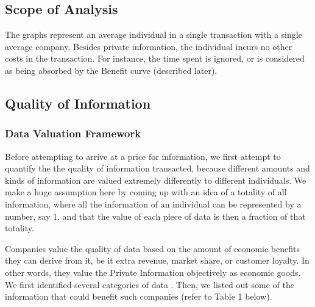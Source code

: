 \documentclass{icmmcm}
\begin{document}
\subsection{Scope of Analysis}
The graphs represent an average individual in a single transaction with a single average company.
Besides private information, the individual incurs no other costs in the transaction. For instance, the time spent is ignored, or is considered as being absorbed by the Benefit curve (described later). 

\subsection{Quality of Information} 
\subsubsection*{Data Valuation Framework}
Before attempting to arrive at a price for information, we first attempt to quantify the the quality of information transacted, because different amounts and kinds of information are valued extremely differently to different individuals. We make a huge assumption here by coming up with an idea of a totality of all information, where all the information of an individual can be represented by a number, say 1, and that the value of each piece of data is then a fraction of that totality.

Companies value the quality of data based on the amount of economic benefits they can derive from it, be it extra revenue, market share, or customer loyalty. In other words, they value the Private Information objectively as economic goods. We first identified several categories of data \citep{classify_data}. Then, we listed out some of the information that could benefit such companies (refer to Table 1 below).
\end{document}
